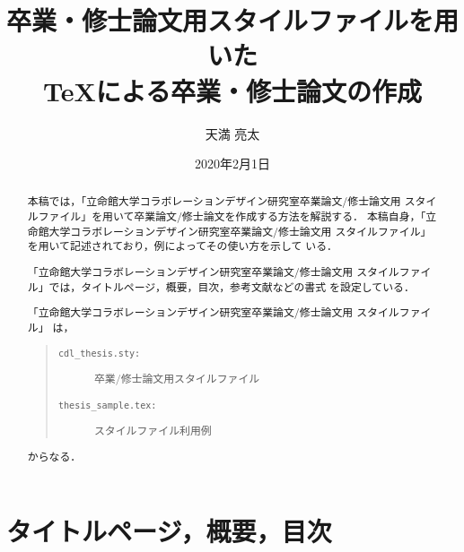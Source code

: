 \documentclass[11pt]{ujreport}
\title{卒業・修士論文用スタイルファイルを用いた\\
       \TeX による卒業・修士論文の作成}
\author{天満 亮太}
\date{2020年2月1日}	%
\begin{document}
\maketitle

\begin{abstract}
 本稿では，「立命館大学コラボレーションデザイン研究室卒業論文/修士論文用
 スタイルファイル」を用いて卒業論文/修士論文を作成する方法を解説する．
本稿自身，「立命館大学コラボレーションデザイン研究室卒業論文/修士論文用
 スタイルファイル」を用いて記述されており，例によってその使い方を示して
 いる．

 「立命館大学コラボレーションデザイン研究室卒業論文/修士論文用
 スタイルファイル」では，タイトルページ，概要，目次，参考文献などの書式
 を設定している．

  「立命館大学コラボレーションデザイン研究室卒業論文/修士論文用
 スタイルファイル」
は，
\begin{quote}
  \begin{description}
    \item[\tt cdl\_thesis.sty:] 卒業/修士論文用スタイルファイル
    \item[\tt thesis\_sample.tex:] スタイルファイル利用例
  \end{description}
\end{quote}
からなる．

\end{abstract}

\tableofcontents


\newpage
{}	%



\chapter{タイトルページ，概要，目次}
\end{document}
